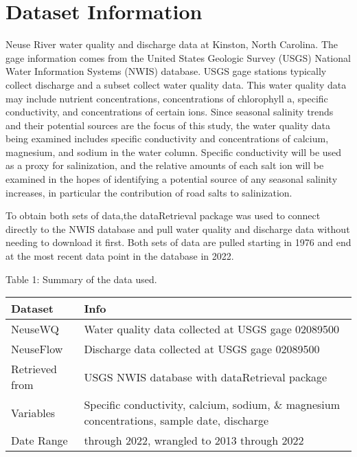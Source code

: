 \documentclass[
  12pt,
]{article}
\begin{document}
\newpage

\hypertarget{dataset-information}{%
\section{Dataset Information}\label{dataset-information}}

Neuse River water quality and discharge data at Kinston, North Carolina.
The gage information comes from the United States Geologic Survey (USGS)
National Water Information Systems (NWIS) database. USGS gage stations
typically collect discharge and a subset collect water quality data.
This water quality data may include nutrient concentrations,
concentrations of chlorophyll a, specific conductivity, and
concentrations of certain ions. Since seasonal salinity trends and their
potential sources are the focus of this study, the water quality data
being examined includes specific conductivity and concentrations of
calcium, magnesium, and sodium in the water column. Specific
conductivity will be used as a proxy for salinization, and the relative
amounts of each salt ion will be examined in the hopes of identifying a
potential source of any seasonal salinity increases, in particular the
contribution of road salts to salinization.

To obtain both sets of data,the dataRetrieval package was used to
connect directly to the NWIS database and pull water quality and
discharge data without needing to download it first. Both sets of data
are pulled starting in 1976 and end at the most recent data point in the
database in 2022.

Table 1: Summary of the data used.

\begin{longtable}[]{@{}
  >{\raggedright\arraybackslash}p{}
  >{\raggedright\arraybackslash}p{}@{}}
\toprule
Dataset & Info \\
\midrule
\endhead
NeuseWQ & Water quality data collected at USGS gage 02089500 \\
NeuseFlow & Discharge data collected at USGS gage 02089500 \\
Retrieved from & USGS NWIS database with dataRetrieval package \\
Variables & Specific conductivity, calcium, sodium, \& magnesium
concentrations, sample date, discharge \\
Date Range & 1976 through 2022, wrangled to 2013 through 2022 \\
\bottomrule
\end{longtable}
\end{document}
